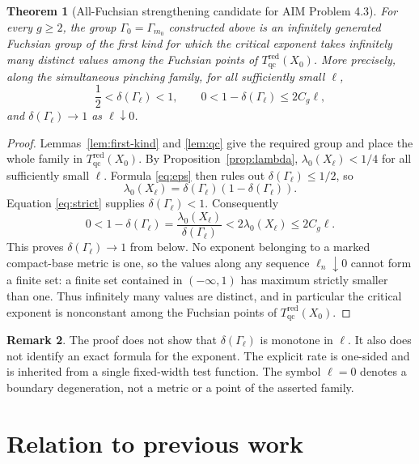 \documentclass[11pt]{article}
\newtheorem{theorem}{Theorem}
\theoremstyle{definition}
\newtheorem{remark}[theorem]{Remark}
\newcommand{\Tqcred}{T_{\mathrm{qc}}^{\mathrm{red}}}
\newcommand{\lamzero}{\lambda_0}
\begin{document}
\begin{theorem}[All-Fuchsian strengthening candidate for AIM Problem 4.3]\label{thm:main}
For every $g\ge2$, the group $\Gamma_0=\Gamma_{m_0}$ constructed above is an
infinitely generated Fuchsian group of the first kind for which the critical
exponent takes infinitely many distinct values among the Fuchsian points of
$\Tqcred(X_0)$.  More
precisely, along the simultaneous pinching family, for all sufficiently small
$\ell$,
\[
 \frac12<\delta(\Gamma_\ell)<1,
 \qquad
 0<1-\delta(\Gamma_\ell)
 \le 2C_g\ell,
\]
and $\delta(\Gamma_\ell)\to1$ as $\ell\downarrow0$.
\end{theorem}

\begin{proof}
Lemmas~\ref{lem:first-kind} and \ref{lem:qc} give the required group and place
the whole family in $\Tqcred(X_0)$.  By
Proposition~\ref{prop:lambda}, $\lamzero(X_\ell)<1/4$ for all sufficiently
small $\ell$.  Formula \eqref{eq:eps} then rules out
$\delta(\Gamma_\ell)\le1/2$, so
\[
 \lamzero(X_\ell)=
 \delta(\Gamma_\ell)(1-\delta(\Gamma_\ell)).
\]
Equation \eqref{eq:strict} supplies $\delta(\Gamma_\ell)<1$.  Consequently
\[
 0<1-\delta(\Gamma_\ell)
 =\frac{\lamzero(X_\ell)}{\delta(\Gamma_\ell)}
 <2\lamzero(X_\ell)
 \le2C_g\ell.
\]
This proves $\delta(\Gamma_\ell)\to1$ from below.  No exponent belonging to a
marked compact-base metric is one, so the values along any sequence
$\ell_n\downarrow0$ cannot form a finite
set: a finite set contained in $(-\infty,1)$ has maximum strictly smaller than
one.  Thus infinitely many values are distinct, and in particular the
critical exponent is nonconstant among the Fuchsian points of
$\Tqcred(X_0)$.
\end{proof}

\begin{remark}
The proof does not show that $\delta(\Gamma_\ell)$ is monotone in $\ell$.
It also does not identify an exact formula for the exponent.  The explicit
rate is one-sided and is inherited from a single fixed-width test function.
The symbol $\ell=0$ denotes a boundary degeneration, not a metric or a point
of the asserted family.
\end{remark}

\section{Relation to previous work}
\end{document}
